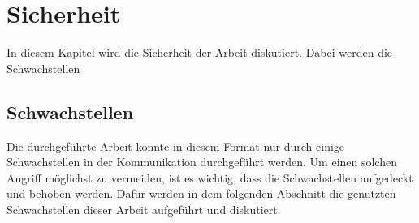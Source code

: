\chapter{Sicherheit}

In diesem Kapitel wird die Sicherheit der Arbeit diskutiert. Dabei werden die Schwachstellen 

\section{Schwachstellen}
Die durchgeführte Arbeit konnte in diesem Format nur durch einige Schwachstellen in der Kommunikation durchgeführt werden.
Um einen solchen Angriff möglichst zu vermeiden, ist es wichtig, dass die Schwachstellen aufgedeckt und behoben werden.
Dafür werden in dem folgenden Abschnitt die genutzten Schwachstellen dieser Arbeit aufgeführt und diskutiert.

